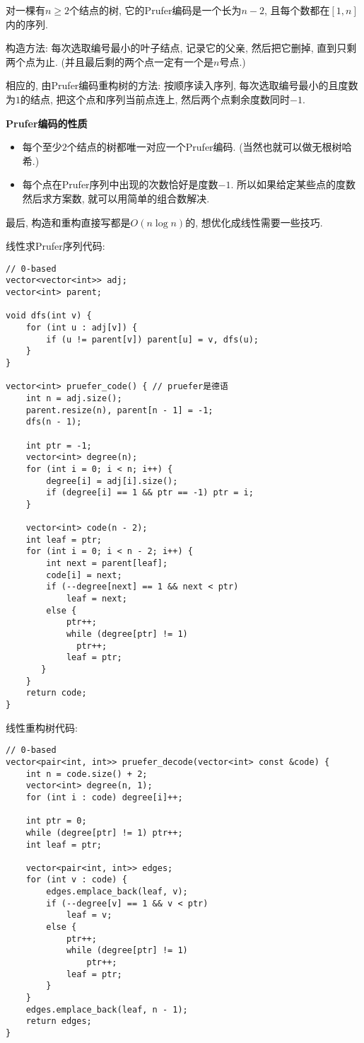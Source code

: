 对一棵有$n \ge 2$个结点的树, 它的Prufer编码是一个长为$n - 2$, 且每个数都在$[1, n]$内的序列.

构造方法: 每次选取编号最小的叶子结点, 记录它的父亲, 然后把它删掉, 直到只剩两个点为止. (并且最后剩的两个点一定有一个是$n$号点.)

相应的, 由Prufer编码重构树的方法: 按顺序读入序列, 每次选取编号最小的且度数为$1$的结点, 把这个点和序列当前点连上, 然后两个点剩余度数同时$-1$. 

\textbf{Prufer编码的性质}

\begin{itemize}
    \item 每个至少$2$个结点的树都唯一对应一个Prufer编码. (当然也就可以做无根树哈希.)
    \item 每个点在Prufer序列中出现的次数恰好是度数$-1$. 所以如果给定某些点的度数然后求方案数, 就可以用简单的组合数解决.
\end{itemize}


最后, 构造和重构直接写都是$O(n\log n)$的, 想优化成线性需要一些技巧.

线性求Prufer序列代码:
\begin{verbatim}
// 0-based
vector<vector<int>> adj;
vector<int> parent;

void dfs(int v) {
    for (int u : adj[v]) {
        if (u != parent[v]) parent[u] = v, dfs(u);
    }
}

vector<int> pruefer_code() { // pruefer是德语
    int n = adj.size();
    parent.resize(n), parent[n - 1] = -1;
    dfs(n - 1);

    int ptr = -1;
    vector<int> degree(n);
    for (int i = 0; i < n; i++) {
        degree[i] = adj[i].size();
        if (degree[i] == 1 && ptr == -1) ptr = i;
    }

    vector<int> code(n - 2);
    int leaf = ptr;
    for (int i = 0; i < n - 2; i++) {
        int next = parent[leaf];
        code[i] = next;
        if (--degree[next] == 1 && next < ptr)
            leaf = next;
        else {
            ptr++;
            while (degree[ptr] != 1)
              ptr++;
            leaf = ptr;
       }
    }
    return code;
}
\end{verbatim}

线性重构树代码:
\begin{verbatim}
// 0-based
vector<pair<int, int>> pruefer_decode(vector<int> const &code) {
    int n = code.size() + 2;
    vector<int> degree(n, 1);
    for (int i : code) degree[i]++;

    int ptr = 0;
    while (degree[ptr] != 1) ptr++;
    int leaf = ptr;

    vector<pair<int, int>> edges;
    for (int v : code) {
        edges.emplace_back(leaf, v);
        if (--degree[v] == 1 && v < ptr)
            leaf = v;
        else {
            ptr++;
            while (degree[ptr] != 1)
                ptr++;
            leaf = ptr;
        }
    }
    edges.emplace_back(leaf, n - 1);
    return edges;
}
\end{verbatim}